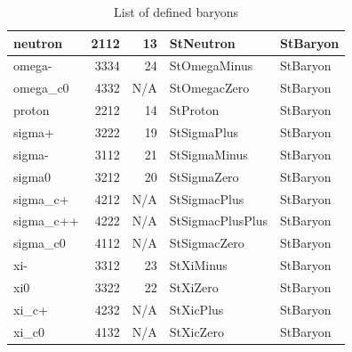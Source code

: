 \documentclass[twoside]{article}
\begin{document}
\begin{table}[htb]
\begin{center}
\begin{tabular}{|l|r|r|l| l |}
       neutron  & 2112  & 13    &            StNeutron  & StBaryon       \\ \hline
        omega-  & 3334  & 24    &         StOmegaMinus  & StBaryon       \\ \hline
      omega\_c0  & 4332  & N/A   &         StOmegacZero  & StBaryon       \\ \hline
        proton  & 2212  & 14    &             StProton  & StBaryon       \\ \hline
        sigma+  & 3222  & 19    &          StSigmaPlus  & StBaryon       \\ \hline
        sigma-  & 3112  & 21    &         StSigmaMinus  & StBaryon       \\ \hline
        sigma0  & 3212  & 20    &          StSigmaZero  & StBaryon       \\ \hline
      sigma\_c+  & 4212  & N/A   &         StSigmacPlus  & StBaryon       \\ \hline
     sigma\_c++  & 4222  & N/A   &     StSigmacPlusPlus  & StBaryon       \\ \hline
      sigma\_c0  & 4112  & N/A   &         StSigmacZero  & StBaryon       \\ \hline
           xi-  & 3312  & 23    &            StXiMinus  & StBaryon       \\ \hline
           xi0  & 3322  & 22    &             StXiZero  & StBaryon       \\ \hline
         xi\_c+  & 4232  & N/A   &            StXicPlus  & StBaryon       \\ \hline
         xi\_c0  & 4132  & N/A   &            StXicZero  & StBaryon       \\ \hline
    \end{tabular}            
    \caption{List of defined baryons}
    \label{tab:baryons}
    \end{center}
\end{table}
\clearpage
\end{document}
